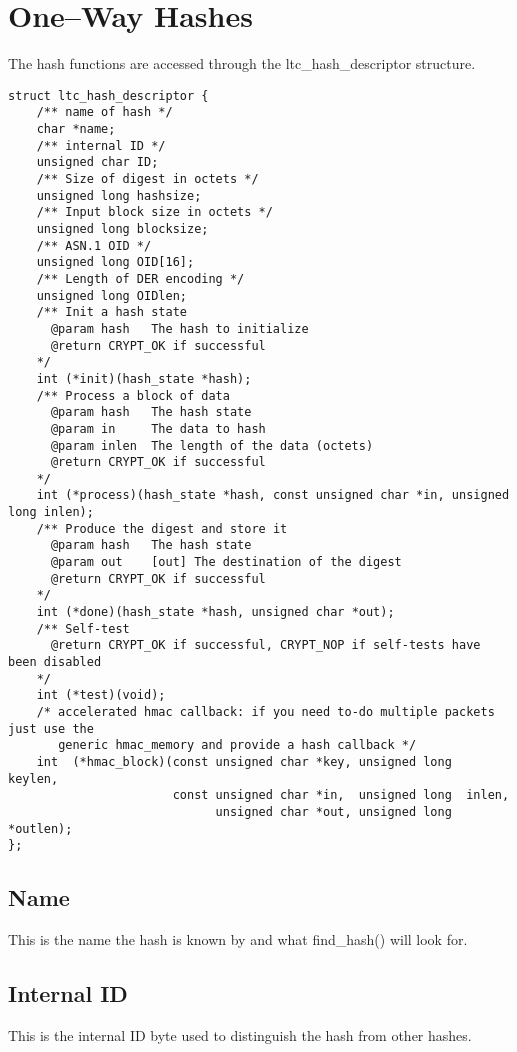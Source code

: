 \documentclass[a4paper]{book}
\begin{document}
\section{One--Way Hashes}
The hash functions are accessed through the ltc\_hash\_descriptor structure.

\begin{small}
\begin{verbatim}
struct ltc_hash_descriptor {
    /** name of hash */
    char *name;
    /** internal ID */
    unsigned char ID;
    /** Size of digest in octets */
    unsigned long hashsize;
    /** Input block size in octets */
    unsigned long blocksize;
    /** ASN.1 OID */
    unsigned long OID[16];
    /** Length of DER encoding */
    unsigned long OIDlen;
    /** Init a hash state
      @param hash   The hash to initialize
      @return CRYPT_OK if successful
    */
    int (*init)(hash_state *hash);
    /** Process a block of data 
      @param hash   The hash state
      @param in     The data to hash
      @param inlen  The length of the data (octets)
      @return CRYPT_OK if successful
    */
    int (*process)(hash_state *hash, const unsigned char *in, unsigned long inlen);
    /** Produce the digest and store it
      @param hash   The hash state
      @param out    [out] The destination of the digest
      @return CRYPT_OK if successful
    */
    int (*done)(hash_state *hash, unsigned char *out);
    /** Self-test
      @return CRYPT_OK if successful, CRYPT_NOP if self-tests have been disabled
    */
    int (*test)(void);
    /* accelerated hmac callback: if you need to-do multiple packets just use the 
       generic hmac_memory and provide a hash callback */
    int  (*hmac_block)(const unsigned char *key, unsigned long  keylen,
                       const unsigned char *in,  unsigned long  inlen, 
                             unsigned char *out, unsigned long *outlen);
};
\end{verbatim}
\end{small}

\subsection{Name}
This is the name the hash is known by and what find\_hash() will look for.

\subsection{Internal ID}
This is the internal ID byte used to distinguish the hash from other hashes.
\end{document}
